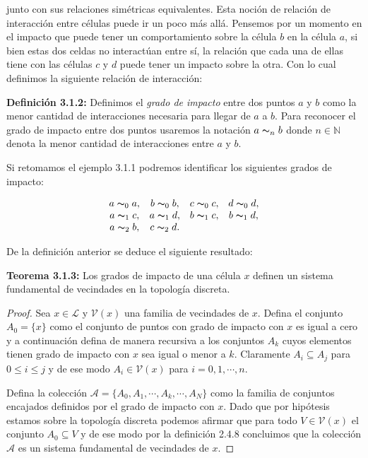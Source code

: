 junto con sus relaciones simétricas equivalentes. Esta noción de relación de interacción entre células puede ir un poco más allá. Pensemos por un momento en el impacto que puede tener un comportamiento sobre la célula $b$ en la célula $a$, si bien estas dos celdas no interactúan entre sí, la relación que cada una de ellas tiene con las células $c$ y $d$ puede tener un impacto sobre la otra. Con lo cual definimos la siguiente relación de interacción:

\textbf{Definición 3.1.2:} Definimos el \textit{grado de impacto} entre dos puntos $a$ y $b$ como la menor cantidad de interacciones necesaria para llegar de $a$ a $b$. Para reconocer el grado de impacto entre dos puntos usaremos la notación $a\thicksim_n b$ donde $n\in\mathbb{N}$ denota la menor cantidad de interacciones entre $a$ y $b$.

Si retomamos el ejemplo 3.1.1 podremos identificar los siguientes grados de impacto:

$$\begin{array}{cccc}
    a\thicksim_0 a, & b\thicksim_0 b, & c\thicksim_0 c, & d\thicksim_0 d, \\ 
    a\thicksim_1 c, & a\thicksim_1 d, & b\thicksim_1 c, & b\thicksim_1 d, \\
    a\thicksim_2 b, & c\thicksim_2 d.
\end{array}$$

De la definición anterior se deduce el siguiente resultado:

\textbf{Teorema 3.1.3:} Los grados de impacto de una célula $x$ definen un sistema fundamental de vecindades en la topología discreta.

\begin{proof}
Sea $x\in\mathcal{L}$ y $\mathcal{V}(x)$ una familia de vecindades de $x$. Defina el conjunto $A_0=\{x\}$ como el conjunto de puntos con grado de impacto con $x$ es igual a cero y a continuación defina de manera recursiva a los conjuntos $A_k$ cuyos elementos tienen grado de impacto con $x$ sea igual o menor a $k$. Claramente $A_i\subseteq A_j$ para $0\leq i\leq j$ y de ese modo $A_i\in\mathcal{V}(x)$ para $i=0,1,\cdots,n$.

Defina la colección $\mathcal{A}=\{A_0,A_1,\cdots,A_k,\cdots,A_N\}$ como la familia de conjuntos encajados definidos por el grado de impacto con $x$. Dado que por hipótesis estamos sobre la topología discreta podemos afirmar que para todo $V\in\mathcal{V}(x)$ el conjunto $A_0\subseteq V$ y de ese modo por la definición 2.4.8 concluimos que la colección $\mathcal{A}$ es un sistema fundamental de vecindades de $x$.
\end{proof}

